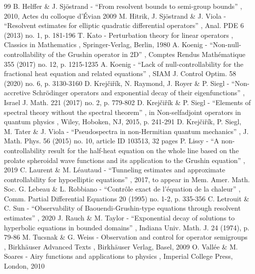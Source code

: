 \documentclass[11pt]{article}
\numberwithin{equation}{section}
\begin{document}
\begin{thebibliography}{99}
 B. Helffer \& J. Sjöstrand - “From resolvent bounds to semi-group bounds” , 2010, Actes du colloque d’Évian 2009
 M. Hitrik, J. Sjöstrand \& J. Viola - “Resolvent estimates for elliptic quadratic differential operators” , Anal. PDE 6 (2013) no. 1, p. 181-196
 T. Kato - Perturbation theory for linear operators , Classics in Mathematics , Springer-Verlag, Berlin, 1980
 A. Koenig - “Non-null-controllability of the Grushin operator in 2D” , Comptes Rendus Mathématique 355 (2017) no. 12, p. 1215-1235
 A. Koenig - “Lack of null-controllability for the fractional heat equation and related equations” , SIAM J. Control Optim. 58 (2020) no. 6, p. 3130-3160
 D. Krejčiřík, N. Raymond, J. Royer \& P. Siegl - “Non-accretive Schrödinger operators and exponential decay of their eigenfunctions” , Israel J. Math. 221 (2017) no. 2, p. 779-802
 D. Krejčiřík \& P. Siegl - “Elements of spectral theory without the spectral theorem” , in Non-selfadjoint operators in quantum physics , Wiley, Hoboken, NJ, 2015, p. 241-291
 D. Krejčiřík, P. Siegl, M. Tater \& J. Viola - “Pseudospectra in non-Hermitian quantum mechanics” , J. Math. Phys. 56 (2015) no. 10, article ID 103513, 32 pages
 P. Lissy - “A non-controllability result for the half-heat equation on the whole line based on the prolate spheroidal wave functions and its application to the Grushin equation” , 2019
 C. Laurent \& M. Léautaud - “Tunneling estimates and approximate controllability for hypoelliptic equations” , 2017, to appear in Mem. Amer. Math. Soc.
 G. Lebeau \& L. Robbiano - “Contrôle exact de l’équation de la chaleur” , Comm. Partial Differential Equations 20 (1995) no. 1-2, p. 335-356
 C. Letrouit \& C. Sun - “Observability of Baouendi-Grushin-type equations through resolvent estimates” , 2020
 J. Rauch \& M. Taylor - “Exponential decay of solutions to hyperbolic equations in bounded domains” , Indiana Univ. Math. J. 24 (1974), p. 79-86
 M. Tucsnak \& G. Weiss - Observation and control for operator semigroups , Birkhäuser Advanced Texts , Birkhäuser Verlag, Basel, 2009
 O. Vallée \& M. Soares - Airy functions and applications to physics , Imperial College Press, London, 2010
\end{thebibliography}
\end{document}
